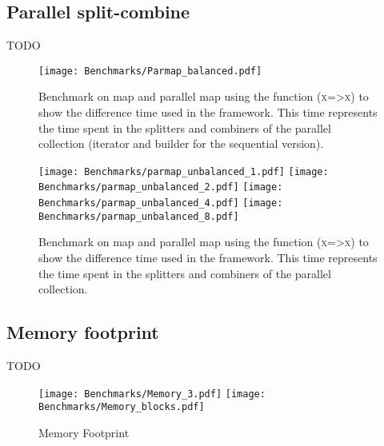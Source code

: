 \FloatBarrier

\subsection{Parallel split-combine}
\color{red} TODO \color{black}

\begin{figure}[h!]
  \centering
  \texttt{[image: Benchmarks/Parmap\_balanced.pdf]}
  \label{ParallelBenchmarks}
  \caption{Benchmark on map and parallel map using the function (\textsc{x=>x}) to show the difference time used in the framework. This time represents the time spent in the splitters and combiners of the parallel collection (iterator and builder for the sequential version).}
\end{figure}

\begin{figure}[h!]
  \centering
  \texttt{[image: Benchmarks/parmap\_unbalanced\_1.pdf]}
  \texttt{[image: Benchmarks/parmap\_unbalanced\_2.pdf]}
  \texttt{[image: Benchmarks/parmap\_unbalanced\_4.pdf]}
  \texttt{[image: Benchmarks/parmap\_unbalanced\_8.pdf]}
  \label{ParallelUnbalancedBenchmarks}
  \caption{Benchmark on map and parallel map using the function (\textsc{x=>x}) to show the difference time used in the framework. This time represents the time spent in the splitters and combiners of the parallel collection.}
\end{figure}

\FloatBarrier


\subsection{Memory footprint}
\color{red} TODO \color{black}

\begin{figure}[h!]
  \centering
  \texttt{[image: Benchmarks/Memory\_3.pdf]}
  \texttt{[image: Benchmarks/Memory\_blocks.pdf]}
  \label{MemoryFootprints}
  \caption{Memory Footprint}
\end{figure}



